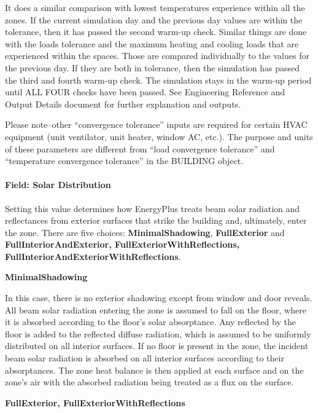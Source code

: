 It does a similar comparison with lowest temperatures experience within all the zones. If the current simulation day and the previous day values are within the tolerance, then it has passed the second warm-up check. Similar things are done with the loads tolerance and the maximum heating and cooling loads that are experienced within the spaces. Those are compared individually to the values for the previous day. If they are both in tolerance, then the simulation has passed the third and fourth warm-up check. The simulation stays in the warm-up period until ALL FOUR checks have been passed. See Engineering Reference and Output Details document for further explanation and outputs.

Please note--other ``convergence tolerance'' inputs are required for certain HVAC equipment (unit ventilator, unit heater, window AC, etc.). The purpose and units of these parameters are different from ``load convergence tolerance'' and ``temperature convergence tolerance'' in the BUILDING object.

\paragraph{Field: Solar Distribution}\label{field-solar-distribution}

Setting this value determines how EnergyPlus treats beam solar radiation and reflectances from exterior surfaces that strike the building and, ultimately, enter the zone. There are five choices: \textbf{MinimalShadowing}, \textbf{FullExterior} and \textbf{FullInteriorAndExterior, FullExteriorWithReflections, FullInteriorAndExteriorWithReflections}.

\textbf{MinimalShadowing}

In this case, there is no exterior shadowing except from window and door reveals. All beam solar radiation entering the zone is assumed to fall on the floor, where it is absorbed according to the floor's solar absorptance. Any reflected by the floor is added to the reflected diffuse radiation, which is assumed to be uniformly distributed on all interior surfaces. If no floor is present in the zone, the incident beam solar radiation is absorbed on all interior surfaces according to their absorptances. The zone heat balance is then applied at each surface and on the zone's air with the absorbed radiation being treated as a flux on the surface.

\textbf{FullExterior, FullExteriorWithReflections}

